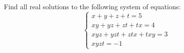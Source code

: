 Find all real solutions to the following system of equations:\[\begin{cases}  x+y+z+t=5\\xy+yz+zt+tx=4\\xyz+yzt+ztx+txy=3\\xyzt=-1\end{cases}\]
